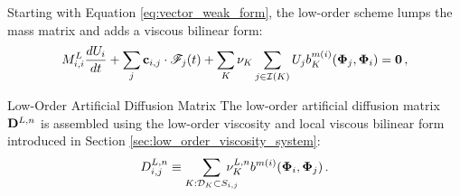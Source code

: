 Starting with Equation \eqref{eq:vector_weak_form}, the low-order scheme
lumps the mass matrix and adds a viscous bilinear form:
\begin{equation}
   M^L_{i,i}\frac{dU_i}{dt}
     + \sum\limits_j\mathbf{c}_{i,j}\cdot\mathscr{F}_j(t)
     + \sum\limits_{K}\nu_K
       \sum\limits_{j\in\mathcal{I}(K)}
         U_jb^{m(i)}_K
           (\mathbf{\Phi}_j, \mathbf{\Phi}_i)
     = \mathbf{0} \,,
\end{equation}
\begin{definition}{Low-Order Artificial Diffusion Matrix}
   The low-order artificial diffusion matrix $\loworderdiffusionmatrix[\timeindex]$
   is assembled using the low-order viscosity and local viscous bilinear
   form introduced in Section \ref{sec:low_order_viscosity_system}:
   \begin{equation}\label{eq:low_order_diffusion_matrix_system}
     \diffusionmatrixletter\ij^{L,\timeindex} \equiv
       \sumKSij\mkern-20mu\lowordercellviscosity[\timeindex]
       \localvisc^{\componentindex(i)}(\vectortestfunction_i,
         \vectortestfunction_j)
     \eqp
   \end{equation}
\end{definition}
